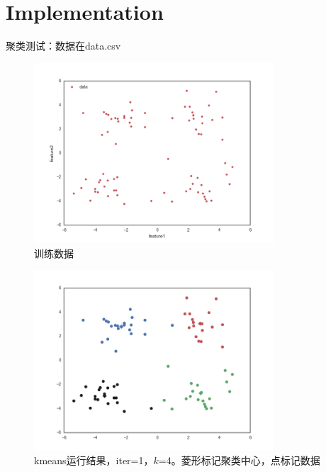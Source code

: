 \documentclass{ctexart}
\begin{document}
%
\section{Implementation}
聚类测试：数据在data.csv
\begin{figure}[H]
\begin{center}
\includegraphics[width=0.8\textwidth]{fig/raw.png} %
\caption{训练数据}
\end{center}
\end{figure}

\begin{figure}[H]
\begin{center}
\includegraphics[width=0.8\textwidth]{fig/iter-01.png} %
\caption{kmeans运行结果，iter=1，$k$=4。菱形标记聚类中心，点标记数据}
\end{center}
\end{figure}
\end{document}
